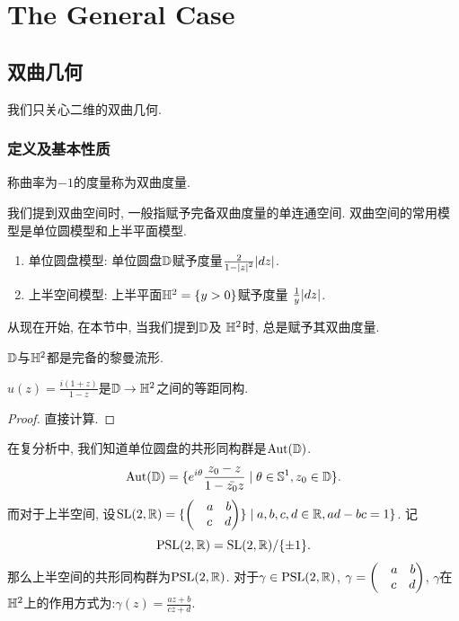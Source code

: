 \section{The General Case}
\subsection{双曲几何}
我们只关心二维的双曲几何.
\subsubsection{定义及基本性质}
\begin{definition}
    称曲率为$-1$的度量称为双曲度量. 
\end{definition}
我们提到双曲空间时, 一般指赋予完备双曲度量的单连通空间.  双曲空间的常用模型是单位圆模型和上半平面模型.
\begin{enumerate}
    \item 单位圆盘模型: 单位圆盘${\mathbb{D}}$赋予度量$\frac{2}{1-{\left | z \right |}^2}{\left | dz \right |}$.
    \item 上半空间模型: 上半平面${\mathbb{H}^2}=\{y>0\}$赋予度量 $\frac{1}{y}{\left | dz \right |}$.
\end{enumerate}
\par 从现在开始, 在本节中, 当我们提到${\mathbb{D}}$及 ${\mathbb{H}^2}$时, 总是赋予其双曲度量. 
\begin{proposition}
    ${\mathbb{D}}$与${\mathbb{H}^2}$都是完备的黎曼流形.
\end{proposition}
\begin{lemma}\label{d2h}
    $u(z)=\frac{i(1+z)}{1-z}$是${\mathbb{D}} \to {\mathbb{H}^2}$之间的等距同构.
\end{lemma}
\begin{proof}
    直接计算.
\end{proof}
在复分析中, 我们知道单位圆盘的共形同构群是${\text{Aut}}({\mathbb{D}})$.
\begin{equation}
    {\text{Aut}}({\mathbb{D}})=\{e^{i\theta}\frac{z_0-z}{1-\bar{z_0}z} \mid \theta \in \mathbb{S}^1, z_0 \in {\mathbb{D}}\} .
\end{equation}
而对于上半空间, 设$\text{SL}(2,{\mathbb{R}})=\{\begin{pmatrix}
    &a{\quad} b \\
    &c{\quad} d
\end{pmatrix}\}\mid a,b,c,d \in {\mathbb{R}}, ad-bc=1\}$. 
记
\begin{equation}
    {\text{PSL}}(2,{\mathbb{R}})=\text{SL}(2,{\mathbb{R}})/\{\pm 1\}.
\end{equation}
那么上半空间的共形同构群为${\text{PSL}}(2,{\mathbb{R}})$. 对于$\gamma\in {\text{PSL}}(2,{\mathbb{R}})$, $\gamma=\begin{pmatrix}
    &a{\quad} b\\
    &c{\quad} d
\end{pmatrix}$, $\gamma$在${\mathbb{H}^2}$上的作用方式为:$\gamma(z)=\frac{az+b}{cz+d}$.
